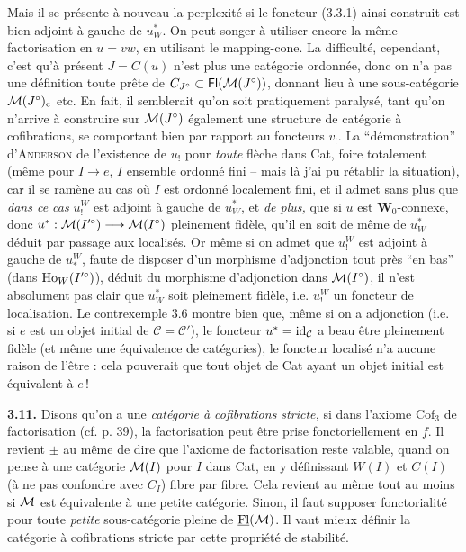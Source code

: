 Mais il se présente à nouveau la perplexité si le foncteur (3.3.1) ainsi construit est bien adjoint à gauche de $u_W^*$. On peut songer à utiliser encore la même factorisation en $u = vw$, en
utilisant le mapping-cone. La difficulté, cependant, c'est qu'à présent $J = C(u)$ n'est plus une catégorie ordonnée, donc on n'a pas une définition toute prête de $C_{J^\circ}\subset\mathsf{Fl}(\mathcal{M}(J^\circ))$, donnant lieu à une sous-catégorie $\mathcal{M}(J^\circ)_{\mathrm{c}}$ etc. En fait, il semblerait qu'on soit pratiquement paralysé, tant qu'on n'arrive à construire sur $\mathcal{M}(J^\circ)$ également une structure de catégorie à cofibrations, se comportant bien par rapport au foncteurs $v_!$. La %
“démonstration” d'\textsc{Anderson} de l'existence de $u_!$ pour \textit{toute} flèche dans Cat, foire totalement (même pour $I\longrightarrow e$, $I$ ensemble ordonné fini – mais là j'ai pu rétablir la situation), car il se ramène au cas où $I$ est ordonné localement fini, et il
admet sans plus que \textit{dans ce cas} $u_!^W$ est adjoint à gauche de $u_W^*$, et \textit{de plus,} que si $u$ est $\mathbf{W}_0$-connexe, donc $u^* : \mathcal{M}(I'^\circ)\longrightarrow\mathcal{M}(I^\circ)$ pleinement fidèle, qu'il en soit de même de $u_W^*$ déduit par passage aux localisés. Or même si on admet que $u_!^W$ est adjoint à gauche de
$u_*^W$, faute de disposer d'un morphisme d'adjonction tout près “en bas” (dans $\mathrm{Ho}_W(I'^\circ)$), %
déduit du morphisme d'adjonction dans $\mathcal{M}(I^\circ)$, il n'est absolument pas clair que $u_W^*$ soit pleinement fidèle, i.e. $u_!^W$ un foncteur de localisation. Le contrexemple 3.6 montre bien que, même si on a adjonction (i.e. si $e$ est un objet initial de $\mathcal{C} = \mathcal{C}'$), le foncteur $u^* = \mathrm{id}_{\mathcal{C}}$ a beau être pleinement fidèle (et même une équivalence de catégories), le foncteur localisé n'a aucune raison de l'être : cela pouverait que tout objet de Cat ayant un objet initial %
est équivalent à $e$\,!

\textbf{3.11.} Disons qu'on a une \textit{catégorie à cofibrations stricte,} si dans l'axiome $\mathrm{Cof}_3$ de factorisation (cf. p. 39), la factorisation peut être prise fonctoriellement en $f$. Il revient $\pm$ au même de dire que l'axiome de factorisation reste valable, quand on pense à une catégorie $\mathcal{M}(I)$ pour $I$ dans Cat, en y définissant $W(I)$ et $C(I)$ (à ne pas confondre avec $C_I$) fibre par fibre. Cela revient au même tout au moins si $\mathcal{M}$ est équivalente à une petite catégorie. Sinon, il faut supposer fonctorialité pour toute \textit{petite} sous-catégorie pleine de $\underline{\mathrm{Fl}}(\mathcal{M})$. Il vaut mieux définir la catégorie à cofibrations stricte par cette propriété de stabilité.

